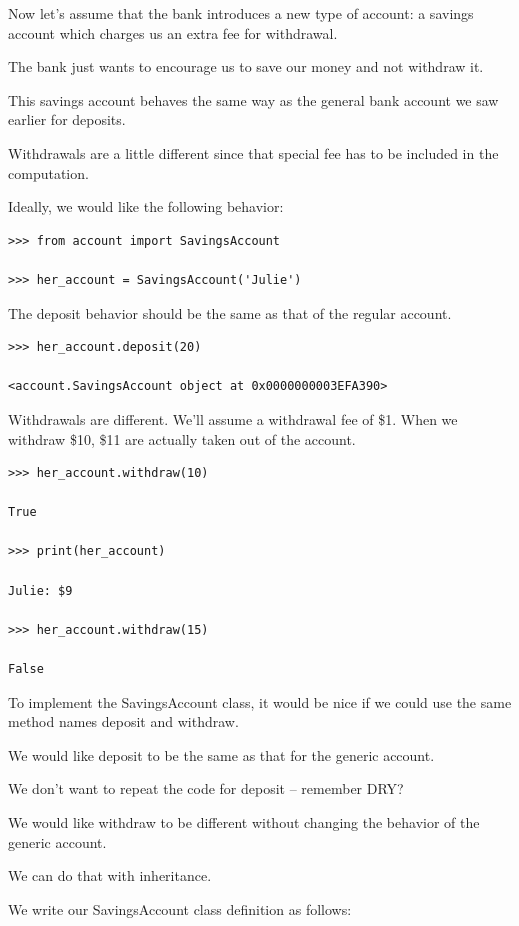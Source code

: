 \documentclass{article}
\begin{document}
Now let’s assume that the bank introduces a new type of account:  a savings account which charges us an extra fee for withdrawal.

The bank just wants to encourage us to save our money and not withdraw it.

This savings account behaves the same way as the general bank account we saw earlier for deposits.

Withdrawals are a little different since that special fee has to be included in the computation.

Ideally, we would like the following behavior:

\begin{lstlisting}
>>> from account import SavingsAccount

>>> her_account = SavingsAccount('Julie')
\end{lstlisting}

The deposit behavior should be the same as that of the regular account.

\begin{lstlisting}
>>> her_account.deposit(20)

<account.SavingsAccount object at 0x0000000003EFA390>
\end{lstlisting}

Withdrawals are different.  We'll assume a withdrawal fee of \$1.  When we withdraw \$10, \$11 are actually taken out of the account.

\begin{lstlisting}
>>> her_account.withdraw(10)

True

>>> print(her_account)

Julie: $9

>>> her_account.withdraw(15)

False
\end{lstlisting}

To implement the SavingsAccount class, it would be nice if we could use the same method names deposit and withdraw.

We would like deposit to be the same as that for the generic account.

We don’t want to repeat the code for deposit – remember DRY?

We would like withdraw to be different without changing the behavior of the generic account.

We can do that with inheritance.

We write our SavingsAccount class definition as follows:
\end{document}
